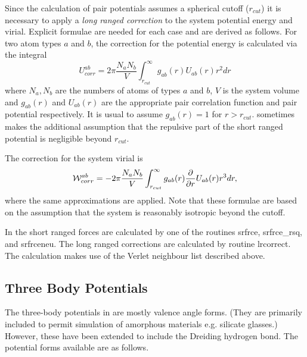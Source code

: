 Since the calculation of pair potentials assumes a spherical cutoff
($r_{cut}$) it is necessary to apply a {\em long ranged
correction} to
the system potential energy and virial. Explicit formulae are needed
for each case and are derived as follows. For two atom types $a$ and
$b$, the correction for the potential energy is calculated via the
integral
\begin{equation}
U_{corr}^{ab}=2\pi
\frac{N_{a}N_{b}}{V}\int_{r_{cut}}^{\infty}g_{ab}(r)U_{ab}(r)r^{2}dr
\end{equation}
where $N_{a},N_{b}$ are the numbers of atoms of types $a$ and $b$, $V$
is the system volume and $g_{ab}(r)$ and $U_{ab}(r)$ are the
appropriate pair correlation function and pair potential respectively.
It is usual to assume $g_{ab}(r)=1$ for $r>r_{cut}$. \D{}
sometimes makes the additional assumption that the repulsive part of
the short ranged potential is negligible beyond $r_{cut}$. 

The correction for the system virial is
\begin{equation}
{\cal W}_{corr}^{ab}=-2\pi
\frac{N_{a}N_{b}}{V}\int_{r_{cut}}^{\infty}g_{ab}(r)\frac{\partial}{\partial
r}U_{ab}(r)r^{3}dr,
\end{equation}
where the same approximations are applied. Note that these formulae
are based on the assumption that the system is reasonably isotropic
beyond the cutoff.

In \D{} the short ranged forces are calculated by one of the
routines {\sc srfrce, srfrce\_rsq,} and {\sc srfrceneu}. The long
ranged corrections are calculated by routine {\sc lrcorrect}. The
calculation makes use of the Verlet neighbour list described above.

\subsection{Three Body Potentials}

The three-body potentials in \D{} are mostly
valence angle forms. (They are
primarily included to permit simulation of amorphous materials
e.g. silicate glasses.) However, these have been extended to include
the Dreiding \cite{mayo-90a} hydrogen
bond. The potential forms available are as follows.

